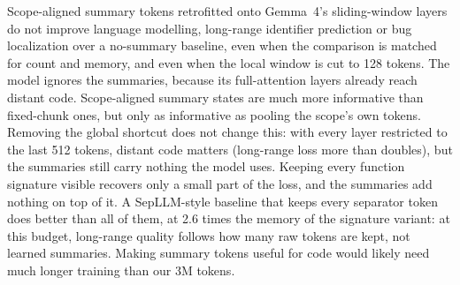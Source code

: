 \documentclass[10pt,twocolumn]{article}
\begin{document}
Scope-aligned summary tokens retrofitted onto Gemma~4's sliding-window layers
do not improve language modelling, long-range identifier prediction or bug
localization over a no-summary baseline, even when the comparison is matched
for count and memory, and even when the local window is cut to 128 tokens.
The model ignores the summaries, because its full-attention layers already
reach distant code. Scope-aligned summary states are much more informative
than fixed-chunk ones, but only as informative as pooling the scope's own
tokens. Removing the global shortcut does not change this: with every layer
restricted to the last 512 tokens, distant code matters (long-range loss
more than doubles), but the summaries still carry nothing the model uses.
Keeping every function signature visible recovers only a small part of
the loss, and the summaries add nothing on top of it. A SepLLM-style
baseline that keeps every separator token does better than all of them, at
2.6 times the memory of the signature variant: at this budget, long-range
quality follows how many raw tokens are kept, not learned summaries. Making
summary tokens useful for code would likely need much longer training than
our 3M tokens.
\end{document}
